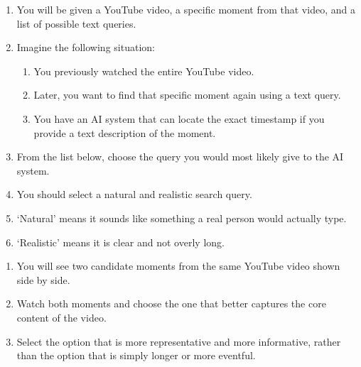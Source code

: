 
\begin{tcolorbox}[
  annotbox,
  title=\textbf{Annotator Instructions: Realistic Query Selection}
]
\small
\setlength{\parindent}{0pt}

\begin{enumerate}[label=\arabic*., leftmargin=*, itemsep=0.35ex, topsep=0.35ex]
  \item You will be given a YouTube video, a specific moment from that video, and a list of possible text queries.
  \item Imagine the following situation:
  \begin{enumerate}[label=\alph*., leftmargin=2.2em, itemsep=0.25ex, topsep=0.25ex]
    \item You previously watched the entire YouTube video.
    \item Later, you want to find that specific moment again using a text query.
    \item You have an AI system that can locate the exact timestamp if you provide a text description of the moment.
  \end{enumerate}
  \item From the list below, choose the query you would most likely give to the AI system.
  \item You should select a natural and realistic search query.
  \item `Natural' means it sounds like something a real person would actually type.
  \item `Realistic' means it is clear and not overly long.
\end{enumerate}
\end{tcolorbox}




\begin{tcolorbox}[
  annotbox,
  title=\textbf{Annotator Instructions: Timestamp Selection}
]
\small
\setlength{\parindent}{0pt}

\begin{enumerate}[label=\arabic*., leftmargin=*, itemsep=0.35ex, topsep=0.35ex]
  \item You will see two candidate moments from the same YouTube video shown side by side.
  \item Watch both moments and choose the one that better captures the core content of the video.
  \item Select the option that is more representative and more informative, rather than the option that is simply longer or more eventful.
\end{enumerate}
\end{tcolorbox}


